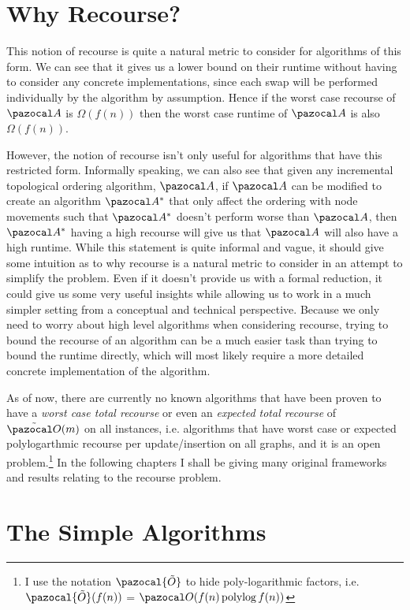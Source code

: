 \documentclass{report}
\DeclareMathOperator*{\polylog}{polylog}
\begin{document}
\section{Why Recourse?}

This notion of recourse is quite a natural metric to consider for algorithms of this form. We can see that it gives us a lower bound on their runtime without having to consider any concrete implementations, since each swap will be performed individually by the algorithm by assumption. Hence if the worst case recourse of $\pazocal A$ is $\Omega(f(n))$ then the worst case runtime of $\pazocal A$ is also $\Omega(f(n))$.

However, the notion of recourse isn't only useful for algorithms that have this restricted form. Informally speaking, we can also see that given any incremental topological ordering algorithm, $\pazocal A$, if $\pazocal A$ can be modified to create an algorithm $\pazocal A^*$ that only affect the ordering with node movements such that $\pazocal A^*$ doesn't perform worse than $\pazocal A$, then $\pazocal A^*$ having a high recourse will give us that $\pazocal A$ will also have a high runtime. While this statement is quite informal and vague, it should give some intuition as to why recourse is a natural metric to consider in an attempt to simplify the problem. Even if it doesn't provide us with a formal reduction, it could give us some very useful insights while allowing us to work in a much simpler setting from a conceptual and technical perspective. Because we only need to worry about high level algorithms when considering recourse, trying to bound the recourse of an algorithm can be a much easier task than trying to bound the runtime directly, which will most likely require a more detailed concrete implementation of the algorithm.

As of now, there are currently no known algorithms that have been proven to have a \textit{worst case total recourse} or even an \textit{expected total recourse} of $\tilde {\pazocal O}(m)$ on all instances, i.e. algorithms that have worst case or expected polylogarthmic recourse per update/insertion on all graphs, and it is an open problem.\footnote{I use the notation $\pazocal{\tilde{O}}$ to hide poly-logarithmic factors, i.e. $\pazocal{\tilde{O}}(f(n))$ = $\pazocal O (f(n) \polylog f(n))$} In the following chapters I shall be giving many original frameworks and results relating to the recourse problem.

\section{The Simple Algorithms}
\end{document}
